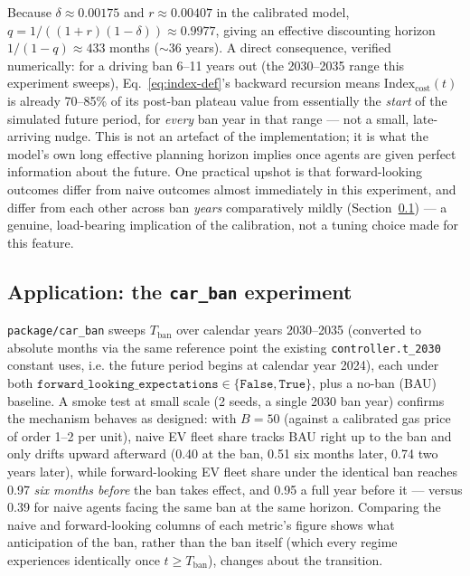 \documentclass[11pt]{article}
\newcommand{\code}[1]{\texttt{#1}}
\begin{document}
Because $\delta \approx 0.00175$ and $r\approx 0.00407$ in the calibrated
model, $q = 1/((1+r)(1-\delta)) \approx 0.9977$, giving an effective
discounting horizon $1/(1-q)\approx 433$ months ($\sim$36 years). A direct
consequence, verified numerically: for a driving ban 6--11 years out (the
2030--2035 range this experiment sweeps), Eq.~\eqref{eq:index-def}'s
backward recursion means $\mathrm{Index}_{\mathrm{cost}}(t)$ is already
70--85\% of its post-ban plateau value from essentially the \emph{start} of
the simulated future period, for \emph{every} ban year in that range ---
not a small, late-arriving nudge. This is not an artefact of the
implementation; it is what the model's own long effective planning horizon
implies once agents are given perfect information about the future. One
practical upshot is that forward-looking outcomes differ from naive
outcomes almost immediately in this experiment, and differ from each other
across ban \emph{years} comparatively mildly (Section~\ref{sec:ban-application}) ---
a genuine, load-bearing implication of the calibration, not a tuning choice
made for this feature.

\subsection{Application: the \code{car\_ban} experiment}
\label{sec:ban-application}

\code{package/car\_ban} sweeps $T_{\mathrm{ban}}$ over calendar years
2030--2035 (converted to absolute months via the same reference point the
existing \code{controller.t\_2030} constant uses, i.e. the future period
begins at calendar year 2024), each under both
$\code{forward\_looking\_expectations}\in\{\code{False},\code{True}\}$, plus
a no-ban (BAU) baseline. A smoke test at small scale (2 seeds, a single
2030 ban year) confirms the mechanism behaves as designed: with
$B=50$ (against a calibrated gas price of order 1--2 per unit), naive
EV fleet share tracks BAU right up to the ban and only drifts upward
afterward (0.40 at the ban, 0.51 six months later, 0.74 two years later),
while forward-looking EV fleet share under the identical ban reaches 0.97
\emph{six months before} the ban takes effect, and 0.95 a full year before
it --- versus 0.39 for naive agents facing the same ban at the same
horizon. Comparing the naive and forward-looking columns of each metric's
figure shows what anticipation of the ban, rather than the ban itself
(which every regime experiences identically once $t\ge T_{\mathrm{ban}}$),
changes about the transition.
\end{document}
